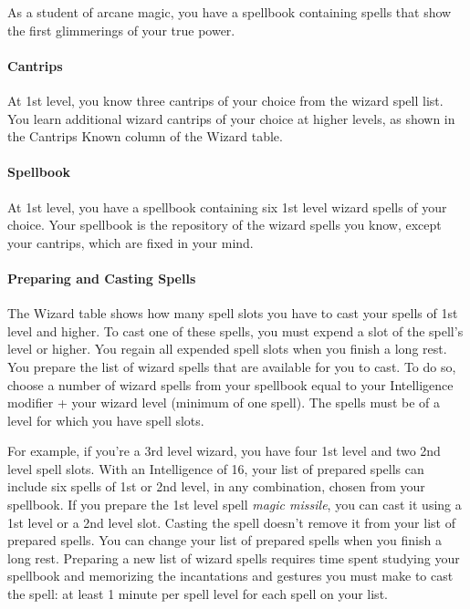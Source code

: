 \documentclass[
]{article}
\begin{document}
As a student of arcane magic, you have a spellbook containing spells
that show the first glimmerings of your true power.

\hypertarget{cantrips}{%
\paragraph{Cantrips}\label{cantrips}}

At 1st level, you know three cantrips of your choice from the wizard
spell list. You learn additional wizard cantrips of your choice at
higher levels, as shown in the Cantrips Known column of the Wizard
table.

\hypertarget{spellbook}{%
\paragraph{Spellbook}\label{spellbook}}

At 1st level, you have a spellbook containing six 1st level wizard
spells of your choice. Your spellbook is the repository of the wizard
spells you know, except your cantrips, which are fixed in your mind.

\hypertarget{preparing-and-casting-spells}{%
\paragraph{Preparing and Casting
Spells}\label{preparing-and-casting-spells}}

The Wizard table shows how many spell slots you have to cast your spells
of 1st level and higher. To cast one of these spells, you must expend a
slot of the spell's level or higher. You regain all expended spell slots
when you finish a long rest. You prepare the list of wizard spells that
are available for you to cast. To do so, choose a number of wizard
spells from your spellbook equal to your Intelligence modifier + your
wizard level (minimum of one spell). The spells must be of a level for
which you have spell slots.

For example, if you're a 3rd level wizard, you have four 1st level and
two 2nd level spell slots. With an Intelligence of 16, your list of
prepared spells can include six spells of 1st or 2nd level, in any
combination, chosen from your spellbook. If you prepare the 1st level
spell \emph{magic missile}, you can cast it using a 1st level or a 2nd
level slot. Casting the spell doesn't remove it from your list of
prepared spells. You can change your list of prepared spells when you
finish a long rest. Preparing a new list of wizard spells requires time
spent studying your spellbook and memorizing the incantations and
gestures you must make to cast the spell: at least 1 minute per spell
level for each spell on your list.
\end{document}
